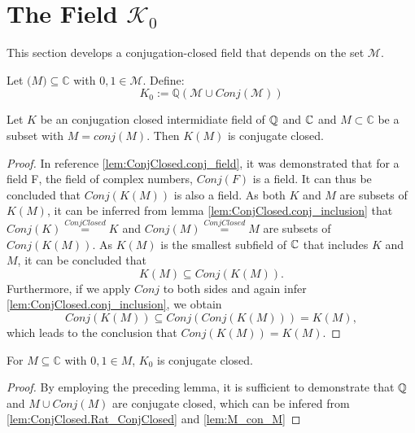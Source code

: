 \section[K zero]{The Field $\mathcal{K}_0$}
This section develops a conjugation-closed field that depends on the set $\mathcal{M}$.
\begin{definition}
    \label{def:K_M_0}
    Let $\mathcal(M)\subseteq\mathbb{C}$ with $0,1 \in \mathcal{M}$. Define:
    \begin{equation*}
        K_0 := \mathbb{Q}(\mathcal{M}\cup Conj(\mathcal{M}))
    \end{equation*}
\end{definition}

\begin{lemma}
    \label{lem:conj_adjion}
    \leanok
    Let $K$ be an conjugation closed intermidiate field of $\mathbb{Q}$ and $\mathbb{C}$ and $ M \subset \mathbb{C}$ be a subset with $M = conj(M)$. Then
    $K(M)$ is conjugate closed.
\end{lemma}
\begin{proof}
    In reference \ref{lem:ConjClosed.conj_field}, it was demonstrated that for a field F, the field of complex numbers, $Conj(F)$ is a field. 
    It can thus be concluded that $Conj(K(M))$ is also a field.
    As both $K$ and $M$ are subsets of $K(M)$, it can be inferred from lemma \ref{lem:ConjClosed.conj_inclusion} that $Conj(K) \overset{ConjClosed}{=} K$ and $Conj(M) \overset{ConjClosed}{=} M$ are subsets of $Conj(K(M))$. 
    As $K(M)$ is the smallest subfield of $\mathbb{C}$ that includes $K$ and $M$, it can be concluded that $$K(M) \subseteq Conj(K(M)).$$
    Furthermore, if we apply $Conj$ to both sides and again infer \ref{lem:ConjClosed.conj_inclusion}, we obtain $$Conj(K(M)) \subseteq Conj(Conj(K(M))) = K(M),$$ 
    which leads to the conclusion that $Conj(K(M)) = K(M)$.
\end{proof}

\begin{corollary}
    \label{cor:K_zero_conjectClosed}
    \leanok
    For $M\subseteq \mathbb{C}$ with $0,1 \in M$, $K_0$ is conjugate closed.
\end{corollary}
\begin{proof}
    By employing the preceding lemma, it is sufficient to demonstrate that $\mathbb{Q}$ and $M \cup Conj(M)$ are conjugate closed,
    which can be infered from \ref{lem:ConjClosed.Rat_ConjClosed} and \ref{lem:M_con_M}
\end{proof}

